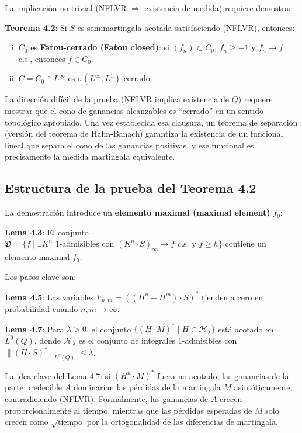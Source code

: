 \documentclass[12pt]{article}
\begin{document}
La implicaci\'on no trivial (NFLVR $\Rightarrow$ existencia de medida) requiere demostrar:

\textbf{Teorema 4.2}: Si $S$ es semimartingala acotada satisfaciendo (NFLVR), entonces:
\begin{enumerate}[(i)]
    \item $C_0$ es \textbf{Fatou-cerrado (Fatou closed)}: si $(f_n) \subset C_0$, $f_n \geq -1$ y $f_n \to f$ c.s., entonces $f \in C_0$.
    \item $C = C_0 \cap L^\infty$ es $\sigma(L^\infty, L^1)$-cerrado.
\end{enumerate}

\begin{intuicion}
La direcci\'on dif\'icil de la prueba (NFLVR implica existencia de $Q$) requiere mostrar que el cono de ganancias alcanzables es ``cerrado'' en un sentido topol\'ogico apropiado. Una vez establecida esa clausura, un teorema de separaci\'on (versi\'on del teorema de Hahn-Banach) garantiza la existencia de un funcional lineal que separa el cono de las ganancias positivas, y ese funcional es precisamente la medida martingala equivalente.
\end{intuicion}

\subsection{Estructura de la prueba del Teorema 4.2}

La demostraci\'on introduce un \textbf{elemento maximal (maximal element)} $f_0$:

\textbf{Lema 4.3}: El conjunto $\mathfrak{D} = \{f \mid \exists K^n \text{ 1-admisibles con } (K^n \cdot S)_\infty \to f \text{ c.s. y } f \geq h\}$ contiene un elemento maximal $f_0$.

Los pasos clave son:

\textbf{Lema 4.5}: Las variables $F_{n,m} = ((H^n - H^m) \cdot S)^*$ tienden a cero en probabilidad cuando $n, m \to \infty$.

\textbf{Lema 4.7}: Para $\lambda > 0$, el conjunto $\{(H \cdot M)^* \mid H \in \mathscr{H}_\lambda\}$ est\'a acotado en $L^0(Q)$, donde $\mathscr{H}_\lambda$ es el conjunto de integrales 1-admisibles con $\|(H \cdot S)^*\|_{L^2(Q)} \leq \lambda$.

La idea clave del Lema 4.7: si $(H^n \cdot M)^*$ fuera no acotado, las ganancias de la parte predecible $A$ dominar\'ian las p\'erdidas de la martingala $M$ asint\'oticamente, contradiciendo (NFLVR). Formalmente, las ganancias de $A$ crecen proporcionalmente al tiempo, mientras que las p\'erdidas esperadas de $M$ solo crecen como $\sqrt{\text{tiempo}}$ por la ortogonalidad de las diferencias de martingala.
\end{document}
